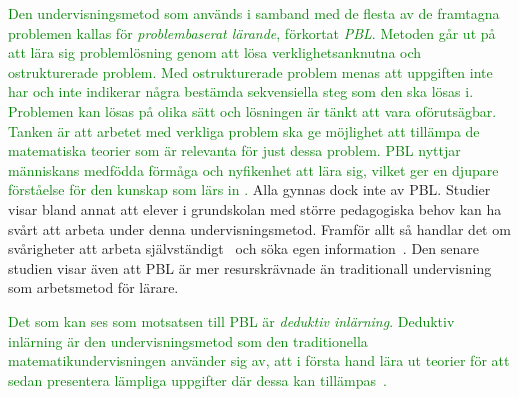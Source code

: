 \textcolor{green}{Den undervisningsmetod som används i samband med de flesta av de framtagna problemen kallas för \textit{problembaserat lärande}, förkortat \textit{PBL}. Metoden går ut på att lära sig problemlösning genom att lösa verklighetsanknutna och ostrukturerade problem. Med ostrukturerade problem menas att uppgiften inte har och inte indikerar några bestämda sekvensiella steg som den ska lösas i. Problemen kan lösas på olika sätt och lösningen är tänkt att vara oförutsägbar. Tanken är att arbetet med verkliga problem ska ge möjlighet att tillämpa de matematiska teorier som är relevanta för just dessa problem. PBL nyttjar människans medfödda förmåga och nyfikenhet att lära sig, vilket ger en djupare förståelse för den kunskap som lärs in \cite{PBLdefinition} \cite{djupareKunskapPBL}.} \textcolor{Mahogany}{Alla gynnas dock inte av PBL. Studier visar bland annat att elever i grundskolan med större pedagogiska behov kan ha svårt att arbeta under denna undervisningsmetod. Framför allt så handlar det om svårigheter att arbeta självständigt~\cite{Johansson} och söka egen information~\cite{Carlsson}. Den senare studien visar även att PBL är mer resurskrävnade än traditionall undervisning som arbetsmetod för lärare.}

\textcolor{green}{Det som kan ses som motsatsen till PBL är \textit{deduktiv inlärning}. Deduktiv inlärning är den undervisningsmetod som den traditionella matematikundervisningen använder sig av, att i första hand lära ut teorier för att sedan presentera lämpliga uppgifter där dessa kan tillämpas~\cite{deduktivInlärning}.}

